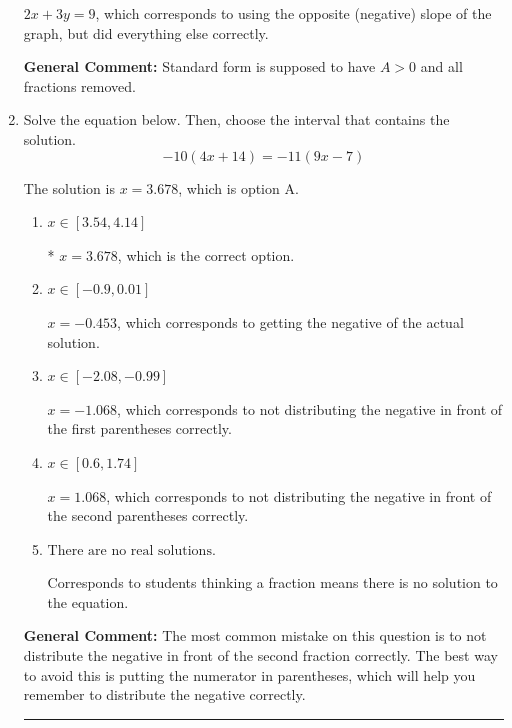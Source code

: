 \documentclass{extbook}[14pt]
\newcommand{\litem}[1]{\item #1

\rule{\textwidth}{0.4pt}}
\begin{document}
\begin{enumerate}
{\begin{enumerate}[label=\Alph*.]
 $2x + 3y = 9$, which corresponds to using the opposite (negative) slope of the graph, but did everything else correctly.
\end{enumerate}

\textbf{General Comment:} Standard form is supposed to have $A > 0$ and all fractions removed.
}
\litem{
Solve the equation below. Then, choose the interval that contains the solution.
\[ -10(4x + 14) = -11(9x -7) \]

The solution is \( x = 3.678 \), which is option A.\begin{enumerate}[label=\Alph*.]
\item \( x \in [3.54, 4.14] \)

* $x = 3.678$, which is the correct option.
\item \( x \in [-0.9, 0.01] \)

$x = -0.453$, which corresponds to getting the negative of the actual solution.
\item \( x \in [-2.08, -0.99] \)

$x = -1.068$, which corresponds to not distributing the negative in front of the first parentheses correctly.
\item \( x \in [0.6, 1.74] \)

$x = 1.068$, which corresponds to not distributing the negative in front of the second parentheses correctly.
\item \( \text{There are no real solutions.} \)

Corresponds to students thinking a fraction means there is no solution to the equation.
\end{enumerate}

\textbf{General Comment:} The most common mistake on this question is to not distribute the negative in front of the second fraction correctly. The best way to avoid this is putting the numerator in parentheses, which will help you remember to distribute the negative correctly.
}
\end{enumerate}
\end{document}
